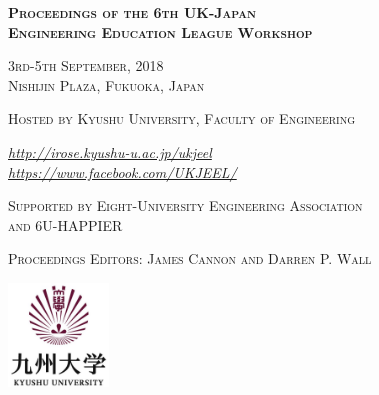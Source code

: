 \begin{titlepage}
\centering
	{\scshape\LARGE\bfseries Proceedings of the 6th  UK-Japan \\
              Engineering Education League Workshop \par}
	\vspace{1cm}
	{\scshape\Large 3rd-5th September, 2018\\
               Nishijin Plaza, Fukuoka, Japan \par}
	\vspace{1.5cm}
	{\scshape\large Hosted by Kyushu University, Faculty of Engineering \par}
	\vspace{1.5cm}
	{\large\itshape \url{http://irose.kyushu-u.ac.jp/ukjeel} \\
                \url{https://www.facebook.com/UKJEEL/}  \par}
	\vfill
	 
	{\scshape\large  Supported by Eight-University Engineering Association \\
          and 6U-HAPPIER \par }
\vspace{0.25cm}
{\scshape Proceedings Editors:  James Cannon  and Darren P. Wall \par }
\vspace{0.5cm}
\includegraphics[width=0.2\textwidth]{kyushu_log.jpg}\par\vspace{1cm}
\end{titlepage}

 
